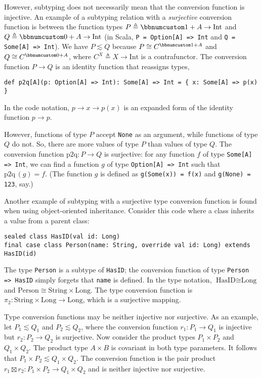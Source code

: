 However, subtyping does not necessarily mean that the conversion function
is injective. An example of a subtyping relation with a \emph{surjective}
conversion function is between the function types $P\triangleq\bbnum 1+A\rightarrow\text{Int}$
and $Q\triangleq\bbnum 0+A\rightarrow\text{Int}$ (in Scala, \lstinline!P = Option[A] => Int!
and \lstinline!Q = Some[A] => Int!). We have $P\lesssim Q$ because
$P\cong C^{\bbnum 1+A}$ and $Q\cong C^{\bbnum 0+A}$, where $C^{X}\triangleq X\rightarrow\text{Int}$
is a contrafunctor. The conversion function $P\rightarrow Q$ is an
identity function that reassigns types,
\begin{lstlisting}
def p2q[A](p: Option[A] => Int): Some[A] => Int = { x: Some[A] => p(x) }
\end{lstlisting}
In the code notation, $p\rightarrow x\rightarrow p(x)$ is an expanded
form of the identity function $p\rightarrow p$. 

However, functions of type $P$ accept \lstinline!None! as an argument,
while functions of type $Q$ do not. So, there are more values of
type $P$ than values of type $Q$. The conversion function $\text{p2q}:P\rightarrow Q$
is surjective: for any function $f$ of type \lstinline!Some[A] => Int!,
we can find a function $g$ of type \lstinline!Option[A] => Int!
such that $\text{p2q}\,(g)=f$. (The function $g$ is defined as \lstinline!g(Some(x)) = f(x)!
and \lstinline!g(None) = 123!, say.)

Another example of subtyping with a surjective type conversion function
is found when using object-oriented inheritance.
Consider this code where a class inherits a value from a parent class:
\begin{lstlisting}
sealed class HasID(val id: Long)
final case class Person(name: String, override val id: Long) extends HasID(id)
\end{lstlisting}
The type \lstinline!Person! is a subtype of \lstinline!HasID!; the
conversion function of type \lstinline!Person => HasID! simply forgets
that \lstinline!name! is defined. In the type notation, $\text{HasID}\cong\text{Long}$
and $\text{Person}\cong\text{String}\times\text{Long}$. The type
conversion function is $\pi_{2}:\text{String}\times\text{Long}\rightarrow\text{Long}$,
which is a surjective mapping.

Type conversion functions may be neither injective nor surjective.
As an example, let $P_{1}\lesssim Q_{1}$ and $P_{2}\lesssim Q_{2}$,
where the conversion function $r_{1}:P_{1}\rightarrow Q_{1}$ is injective
but $r_{2}:P_{2}\rightarrow Q_{2}$ is surjective. Now consider the
product types $P_{1}\times P_{2}$ and $Q_{1}\times Q_{2}$. The product
type $A\times B$ is covariant in both type parameters. It follows
that $P_{1}\times P_{2}\lesssim Q_{1}\times Q_{2}$. The conversion
function is the pair product $r_{1}\boxtimes r_{2}:P_{1}\times P_{2}\rightarrow Q_{1}\times Q_{2}$
and is neither injective nor surjective.

